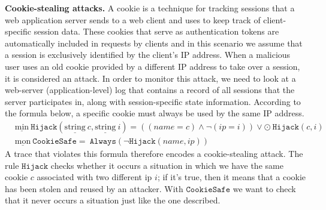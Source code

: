 \documentclass[english]{article}
\begin{document}
\textbf{Cookie-stealing attacks.}
A cookie is a technique for tracking sessions that a web application server sends to a web client and uses to keep track of client-specific session data. These cookies that serve as authentication tokens are automatically included in requests by clients and in this scenario we assume that a session is exclusively identified by the client's IP address. When a malicious user uses an old cookie provided by a different IP address to take over a session, it is considered an attack. In order to monitor this attack, we need to look at a web-server (application-level) log that contains a record of all sessions that the server participates in, along with session-specific state information.
According to the formula below, a specific cookie must always be used by the same IP address.
\begin{align*}
    & \underline{\text{min}}\ \mathtt{Hijack}(\underline{\text{string}}\ c,\underline{\text{string}}\ i) = ((name=c)\land\neg(ip=i))\lor\odot\ \mathtt{Hijack}(c,i) \\
    & \underline{\text{mon}}\ \mathtt{CookieSafe} =\ \mathtt{Always}(\neg\mathtt{Hijack}(name,ip)) 
\end{align*}
A trace that violates this formula therefore encodes a cookie-stealing attack. The rule $\mathtt{Hijack}$ checks whether it occurs a situation in which we have the same cookie $c$ associated with two different ip $i$; if it's true, then it means that a cookie has been stolen and reused by an attacker. With $\mathtt{CookieSafe}$ we want to check that it never occurs a situation just like the one described.
\end{document}
